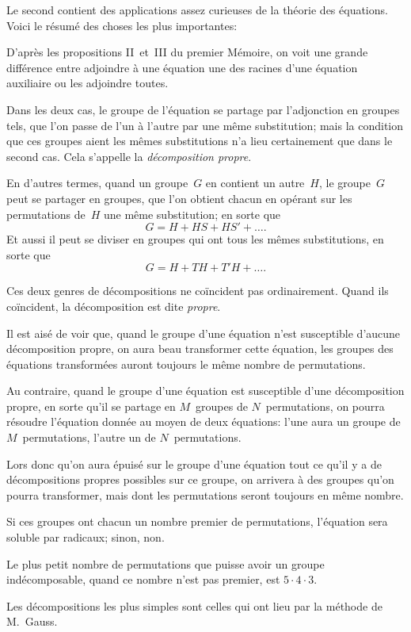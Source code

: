 \documentclass[leqno,12pt]{book}[2005/09/16]
\let\Primo=\primo
\let\Secundo=\secundo
\renewcommand{\primo}{{\upshape\Primo}}
\renewcommand{\secundo}{{\upshape\Secundo}}
\begin{document}
Le second contient des applications assez curieuses de la
théorie des équations. Voici le résumé des choses les plus importantes:

\primo D'après les propositions II~et~III du premier Mémoire, on
voit une grande différence entre adjoindre à une équation une des
racines d'une équation auxiliaire ou les adjoindre toutes.

Dans les deux cas, le groupe de l'équation se partage par l'adjonction
en groupes tels, que l'on passe de l'un à l'autre par une
même substitution; mais la condition que ces groupes aient les
mêmes substitutions n'a lieu certainement que dans le second
cas. Cela s'appelle la \emph{décomposition propre}.

En d'autres termes, quand un groupe~$G$ en contient un autre~$H$,
le groupe~$G$ peut se partager en groupes, que l'on obtient chacun
en opérant sur les permutations de~$H$ une même substitution; en
sorte que
\[
G = H + HS + HS' + \dots.
\]
Et aussi il peut se diviser en groupes qui ont tous les mêmes substitutions,
en sorte que
\[
G = H + TH + T'H + \dots.
\]

Ces deux genres de décompositions ne coïncident pas ordinairement.
Quand ils coïncident, la décomposition est dite \emph{propre}.

Il est aisé de voir que, quand le groupe d'une équation n'est
susceptible d'aucune décomposition propre, on aura beau transformer
cette équation, les groupes des équations transformées
auront toujours le même nombre de permutations.

Au contraire, quand le groupe d'une équation est susceptible
d'une décomposition propre, en sorte qu'il se partage en $M$~groupes
de $N$~permutations, on pourra résoudre l'équation donnée
au moyen de deux équations: l'une aura un groupe de $M$~permutations,
l'autre un de $N$~permutations.

Lors donc qu'on aura épuisé sur le groupe d'une équation tout
ce qu'il y a de décompositions propres possibles sur ce groupe,
on arrivera à des groupes qu'on pourra transformer, mais dont
les permutations seront toujours en même nombre.

Si ces groupes ont chacun un nombre premier de permutations,
l'équation sera soluble par radicaux; sinon, non.

Le plus petit nombre de permutations que puisse avoir un
groupe indécomposable, quand ce nombre n'est pas premier,
est $5 · 4 · 3$.

\secundo Les décompositions les plus simples sont celles qui ont lieu
par la méthode de M.~Gauss.
\end{document}
